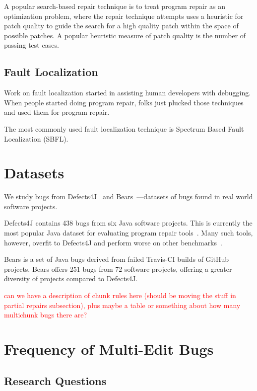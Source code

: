 \documentclass[sigconf, timestamp-false, anonymous=true]{acmart}
\newcommand\todo[1]{\textcolor{red}{#1}}
\begin{document}
A popular search-based repair technique is to treat program repair as an optimization 
problem, where the repair technique attempts uses a heuristic for patch quality to guide 
the search for a high quality patch within the space of possible patches. A popular heuristic
measure of patch quality is the number of passing test cases.

\subsection{Fault Localization}

Work on fault localization started in assisting human developers with debugging. When people started doing program repair, folks just plucked those techniques and used them for program repair. 

The most commonly used fault localization technique is Spectrum Based Fault Localization (SBFL). 

\section{Datasets}
We study bugs from Defects4J~\cite{defects4j} and Bears~\cite{bears}---datasets of 
bugs found in real world software projects.

Defects4J contains 438 bugs from six Java software projects. This  
is currently the most popular Java dataset for evaluating program repair tools~\cite{durieux-repair-them-all}.
Many such tools, however, overfit to Defects4J and perform worse on other 
benchmarks~\cite{durieux-repair-them-all}. 

Bears is a set of Java bugs derived from failed Travis-CI builds of GitHub projects.
Bears offers 251 bugs from 72 software projects, offering a greater diversity of 
projects compared to Defects4J.

\todo{can we have a description of chunk rules here (should be moving the stuff in partial repairs subsection), plus maybe a table or something about how many multichunk bugs there are?}

\section{Frequency of Multi-Edit Bugs}

\subsection{Research Questions}
\end{document}
